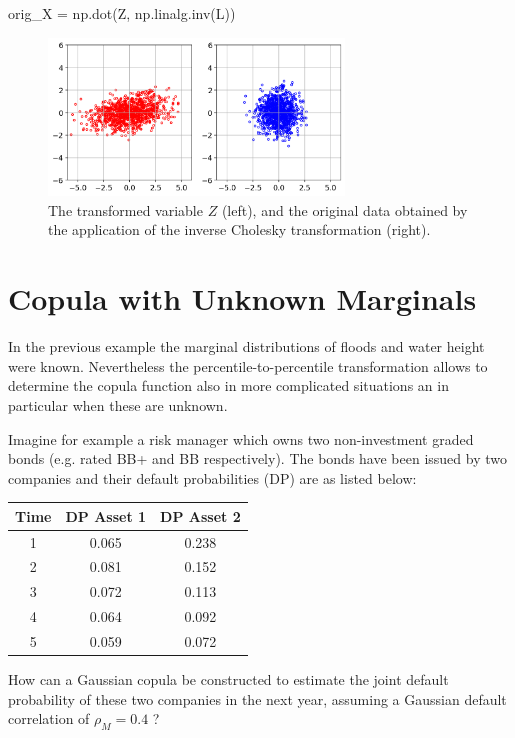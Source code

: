 \begin{ipython}
orig_X = np.dot(Z, np.linalg.inv(L))
\end{ipython}

\begin{figure}[htbp]
  \centering
  \includegraphics[width=0.7\textwidth]{figures/cholesky_inv}
  \caption{The transformed variable $Z$ (left), and the original data obtained by the application of the inverse Cholesky transformation (right).}
  \label{fig:cholesky_inv}
\end{figure}


\section{Copula with Unknown Marginals}
In the previous example the marginal distributions of floods and water height were known. Nevertheless the percentile-to-percentile transformation allows to determine the copula function also in more complicated situations an in particular when these are unknown.

Imagine for example a risk manager which owns two non-investment graded bonds (e.g. rated BB+ and BB respectively). The bonds have been issued by two companies and their default probabilities (DP) are as listed below:

\begin{table}[htbp]
\centering
\begin{tabular}{|c|c|c|}
\hline
Time & DP Asset 1 & DP Asset 2 \\
\hline
\hline
1 & 0.065 & 0.238 \\
2 & 0.081 & 0.152 \\
3 & 0.072 & 0.113 \\
4 & 0.064 & 0.092 \\
5 & 0.059 & 0.072 \\
\hline
\end{tabular}
\end{table}

How can a Gaussian copula be constructed to estimate the joint default probability of these two companies in the next year, assuming a Gaussian default correlation of $\rho_M = 0.4$ ?

